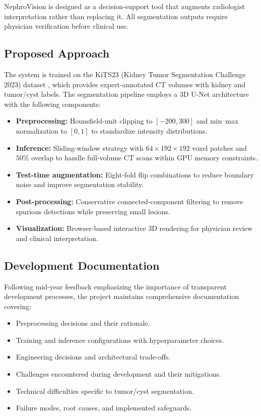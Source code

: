 NephroVision is designed as a decision-support tool that augments radiologist interpretation rather than replacing it. All segmentation outputs require physician verification before clinical use.

\subsection{Proposed Approach}

The system is trained on the KiTS23 (Kidney Tumor Segmentation Challenge 2023) dataset \cite{kits23}, which provides expert-annotated CT volumes with kidney and tumor/cyst labels. The segmentation pipeline employs a 3D U-Net architecture \cite{unet3d} with the following components:

\begin{itemize}
    \item \textbf{Preprocessing:} Hounsfield-unit clipping to $[-200, 300]$ and min--max normalization to $[0, 1]$ to standardize intensity distributions.
    \item \textbf{Inference:} Sliding-window strategy with $64 \times 192 \times 192$ voxel patches and $50\%$ overlap to handle full-volume CT scans within GPU memory constraints.
    \item \textbf{Test-time augmentation:} Eight-fold flip combinations to reduce boundary noise and improve segmentation stability.
    \item \textbf{Post-processing:} Conservative connected-component filtering to remove spurious detections while preserving small lesions.
    \item \textbf{Visualization:} Browser-based interactive 3D rendering for physician review and clinical interpretation.
\end{itemize}

\subsection{Development Documentation}

Following mid-year feedback emphasizing the importance of transparent development processes, the project maintains comprehensive documentation covering:
\begin{itemize}
    \item Preprocessing decisions and their rationale.
    \item Training and inference configurations with hyperparameter choices.
    \item Engineering decisions and architectural trade-offs.
    \item Challenges encountered during development and their mitigations.
    \item Technical difficulties specific to tumor/cyst segmentation.
    \item Failure modes, root causes, and implemented safeguards.
\end{itemize}

